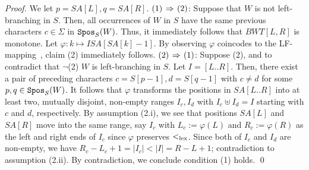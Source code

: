 \begin{proof}
We let $p = SA[L], q = SA[R]$. 
$(1)\mathbin{\,\Rightarrow\,} (2)$: Suppose that $W$ is not left-branching in $S$.
Then, all occurrences of $W$ in $S$ have the same previous characters $c \in \Sigma$ in $\mathtt{Spos}_{S}(W)$. Thus, it immediately follows that $BWT[L, R]$ is monotone.
Let $\varphi: k \mapsto ISA[SA[k]-1]$. By observing $\varphi$ coincodes to the LF-mapping~\cite{Ferragina05:FM}, claim (2) immediately follows. 
$(2) \mathbin{\,\Rightarrow\,} (1)$: 
Suppose (2), and to contradict that $\neg$(2) $W$ is left-branching in $S$. Let $I = [L..R]$. Then, there exist a pair of preceding characters $c = S[p-1], d=S[q-1]$ with $c\not= d$ for some $p, q \in \mathtt{Spos}_{S}(W)$. It follows that $\varphi$ transforms the positions in  $SA[L..R]$ into at least two, mutually disjoint, non-empty ranges $I_c, I_d$ with $I_c\uplus I_d = I$ starting with $c$ and $d$, respectively. By assumption (2.i), we see that positions $SA[L]$ and $SA[R]$ move into the same range, say $I_c$ with $L_c := \varphi(L)$ and $R_c := \varphi(R)$ as the left and right ends of $I_c$ since $\varphi$ preserves $<_{\mathrm{lex}}$. 
Since both of $I_c$ and $I_d$ are non-empty, we have $R_c - L_c + 1 = |I_c| < |I| = R - L + 1$; contradiction to assumption (2.ii). By contradiction, we conclude condition (1) holds. 
\qed   
\end{proof}


